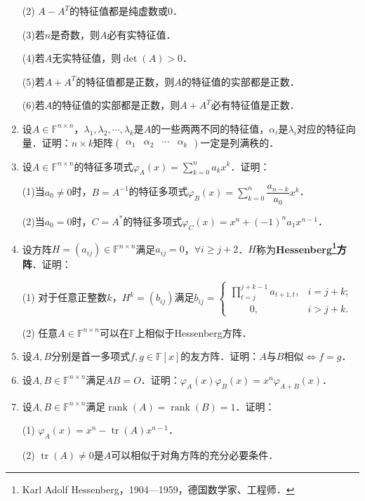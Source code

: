 \documentclass[a4paper,fontset=windows]{ctexbook}
\theoremstyle{definition}
\DeclareMathOperator{\rank}{rank}
\DeclareMathOperator{\tr}{tr}
\renewcommand{\ge}{\geqslant}
\begin{document}
\begin{enumerate}
(2) $A-A^T$的特征值都是纯虚数或0．

(3)若$n$是奇数，则$A$必有实特征值．

(4)若$A$无实特征值，则$\det(A)>0$．

(5)若$A+A^T$的特征值都是正数，则$A$的特征值的实部都是正数．

(6)若$A$的特征值的实部都是正数，则$A+A^T$必有特征值是正数．

\item 设$A\in\mathbb{F}^{n\times n}$，$\lambda_1,\lambda_2,\cdots,\lambda_k$是$A$的一些两两不同的特征值，$\alpha_i$是$\lambda_i$对应的特征向量．证明：$n\times k$矩阵$\begin{pmatrix}\alpha_1&\alpha_2&\cdots&\alpha_k\end{pmatrix}$一定是列满秩的．

\item 设$A\in\mathbb{F}^{n\times n}$的特征多项式$\varphi_A(x)=\sum\limits_{k=0}^na_kx^k$．证明：

(1)当$a_0\ne 0$时，$B=A^{-1}$的特征多项式$\varphi_B(x)=\sum\limits_{k=0}^n\dfrac{a_{n-k}}{a_0}x^k$．

(2)当$a_0=0$时，$C=A^*$的特征多项式$\varphi_C(x)=x^n+(-1)^na_1x^{n-1}$．

\item 设方阵$H=(a_{ij})\in\mathbb{F}^{n\times n}$满足$a_{ij}=0$，$\forall i\ge j+2$．$H$称为{\bf Hessenberg\footnote{Karl Adolf Hessenberg，1904—1959，德国数学家、工程师．}方阵}．证明：

(1) 对于任意正整数$k$，$H^k=(b_{ij})$满足$b_{ij}=\begin{cases}\prod\limits_{t=j}^{j+k-1}a_{t+1,t},&i=j+k; \\ \qquad 0,&i>j+k.\end{cases}$

(2) 任意$A\in\mathbb{F}^{n\times n}$可以在$\mathbb{F}$上相似于Hessenberg方阵．

\item 设$A,B$分别是首一多项式$f,g\in\mathbb{F}[x]$的友方阵．证明：$A$与$B$相似$\Leftrightarrow f=g$．

\item 设$A,B\in\mathbb{F}^{n\times n}$满足$AB=O$．证明：$\varphi_A(x)\varphi_B(x)=x^n\varphi_{A+B}(x)$．

\item 设$A,B\in\mathbb{F}^{n\times n}$满足$\rank(A)=\rank(B)=1$．证明：

(1) $\varphi_A(x)=x^n-\tr(A)x^{n-1}$．

(2) $\tr(A)\ne 0$是$A$可以相似于对角方阵的充分必要条件．


\end{enumerate}
\end{document}
